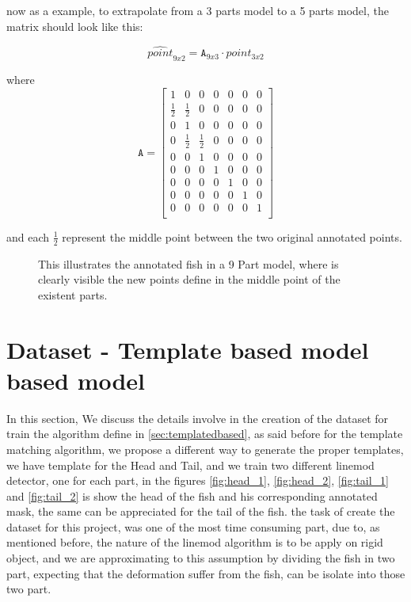 now as a example, to extrapolate from a 3 parts model to a 5 parts model, the matrix
should look like this:


\begin{equation}
\hat{point}_{9x2} =\mathtt{A}_{9x3} \cdot point_{3x2}
\end{equation}

where
 \begin{equation}
 \label{eq:extrapole}
\mathtt{A} =
\begin{bmatrix}
1  & 0 & 0 & 0 & 0 & 0 & 0 \\
\frac{1}{2} & \frac{1}{2}  & 0 & 0 & 0 & 0 & 0 \\
0 & 1  & 0 & 0 & 0 & 0 & 0  \\
0 & \frac{1}{2} & \frac{1}{2} & 0 & 0 & 0 & 0 \\
0  & 0 & 1 & 0 & 0 & 0 & 0  \\
0  & 0 & 0 & 1 & 0 & 0 & 0  \\
0  & 0 & 0 & 0 & 1 & 0 & 0 \\
0  & 0 & 0 & 0 & 0 & 1 & 0 \\
0  & 0 & 0 & 0 & 0 & 0 & 1  \\
\end{bmatrix}
 \end{equation}

and each $\frac{1}{2}$ represent the middle point between the two original annotated
points.

\begin{figure}
\begin{adjustwidth}{-1in}{-1in} 
\label{fig:anotated1}
\centering     %
{}
\caption{This illustrates the annotated fish in a 9 Part model, where is clearly visible
the new points define in the middle point of the existent parts.}
\end{adjustwidth}
\end{figure}

 \section{Dataset - Template based model based model}
 In this section, We discuss the details involve in the creation of the dataset for
 train the algorithm define in \ref{sec:templatedbased}, as said before for the template 
 matching algorithm, we propose a different way to generate the proper templates, 
 we have template for the Head and Tail, and we train two different linemod detector,
 one for each part, in the figures \ref{fig:head_1}, \ref{fig:head_2}, \ref{fig:tail_1} and
 \ref{fig:tail_2} is show the head of the fish and his corresponding annotated mask, 
 the same can be appreciated for the tail of the fish. the task of create the dataset
 for this project, was one of the most time consuming part, due to, as mentioned before, 
 the nature of the linemod algorithm is to be apply on rigid object, and we are approximating to this
 assumption by dividing the fish in two part, expecting that the deformation suffer from the
 fish, can be isolate into those two part.

